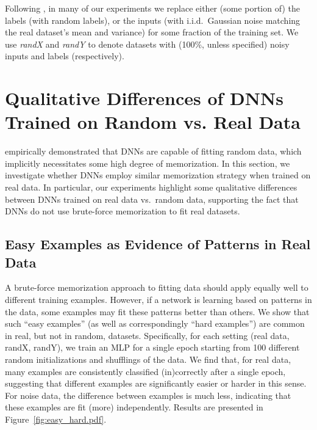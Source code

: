 \documentclass{article}
\begin{document}
Following \citet{understanding_DL}, in many of our experiments we replace either (some portion of) the labels (with random labels), or the inputs (with i.i.d.~Gaussian noise matching the real dataset's mean and variance) for some fraction of the training set. 
We use \emph{randX} and \emph{randY} to denote datasets with (100\%, unless specified) noisy inputs and labels (respectively).




\section{Qualitative Differences of DNNs Trained on Random vs. Real Data}
\label{sec:qualitative_differences}

\citet{understanding_DL} empirically demonstrated that DNNs are capable of fitting random data, which implicitly necessitates some high degree of memorization.
In this section, we investigate whether DNNs employ similar memorization strategy when trained on real data.  
In particular, our experiments highlight some qualitative differences between DNNs trained on real data vs.~random data, supporting the fact that DNNs do not use brute-force memorization to fit real datasets.



\subsection{Easy Examples as Evidence of Patterns in Real Data}
\label{sec:easy_examples}
A brute-force memorization approach to fitting data should apply equally well to different training examples.
However, if a network is learning based on patterns in the data, some examples may fit these patterns better than others.
We show that such ``easy examples'' (as well as correspondingly ``hard examples'') are common in real, but not in random, datasets.
Specifically, for each setting (real data, randX, randY), we train an MLP for a single epoch starting from 100 different random initializations and shufflings of the data.
We find that, for real data, many examples are consistently classified (in)correctly after a single epoch, suggesting that different examples are significantly easier or harder in this sense.
For noise data, the difference between examples is much less, indicating that these examples are fit (more) independently.
Results are presented in Figure~\ref{fig:easy_hard.pdf}.
\end{document}
